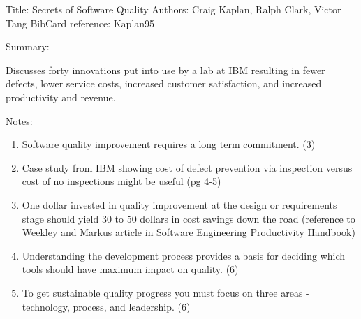 \documentclass{article}
\begin{document}
Title: Secrets of Software Quality
Authors: Craig Kaplan, Ralph Clark, Victor Tang
BibCard reference: Kaplan95

Summary:

Discusses forty innovations put into use by a lab at IBM resulting in
fewer defects, lower service costs, increased customer satisfaction, and
increased productivity and revenue. 


Notes:
\begin{enumerate}
\item Software quality improvement requires a long term commitment. (3) 
\item Case study from IBM showing cost of defect prevention via inspection
versus cost of no inspections might be useful (pg 4-5)
\item One dollar invested in quality improvement at the design or
requirements stage should yield 30 to 50 dollars in cost savings down the
road (reference to Weekley and Markus article in Software Engineering
Productivity Handbook)
\item Understanding the development process provides a basis for deciding
which tools should have maximum impact on quality. (6)
\item To get sustainable quality progress you must focus on three areas -
technology, process, and leadership. (6)
\end{enumerate}
\end{document}
